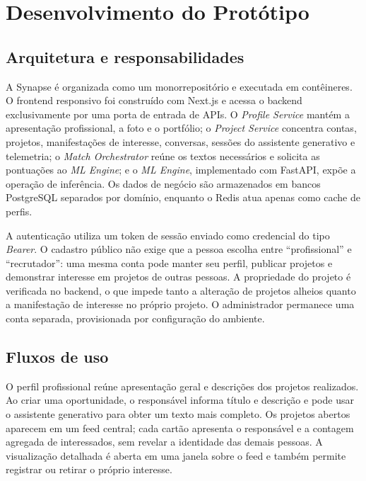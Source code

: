 \documentclass[12pt]{article}
\begin{document}
\section{Desenvolvimento do Protótipo}

\subsection{Arquitetura e responsabilidades}

A Synapse é organizada como um monorrepositório e executada em contêineres. O frontend responsivo foi construído com Next.js e acessa o backend exclusivamente por uma porta de entrada de APIs. O \textit{Profile Service} mantém a apresentação profissional, a foto e o portfólio; o \textit{Project Service} concentra contas, projetos, manifestações de interesse, conversas, sessões do assistente generativo e telemetria; o \textit{Match Orchestrator} reúne os textos necessários e solicita as pontuações ao \textit{ML Engine}; e o \textit{ML Engine}, implementado com FastAPI, expõe a operação de inferência. Os dados de negócio são armazenados em bancos PostgreSQL separados por domínio, enquanto o Redis atua apenas como cache de perfis.

A autenticação utiliza um token de sessão enviado como credencial do tipo \textit{Bearer}. O cadastro público não exige que a pessoa escolha entre ``profissional'' e ``recrutador'': uma mesma conta pode manter seu perfil, publicar projetos e demonstrar interesse em projetos de outras pessoas. A propriedade do projeto é verificada no backend, o que impede tanto a alteração de projetos alheios quanto a manifestação de interesse no próprio projeto. O administrador permanece uma conta separada, provisionada por configuração do ambiente.

\subsection{Fluxos de uso}

O perfil profissional reúne apresentação geral e descrições dos projetos realizados. Ao criar uma oportunidade, o responsável informa título e descrição e pode usar o assistente generativo para obter um texto mais completo. Os projetos abertos aparecem em um feed central; cada cartão apresenta o responsável e a contagem agregada de interessados, sem revelar a identidade das demais pessoas. A visualização detalhada é aberta em uma janela sobre o feed e também permite registrar ou retirar o próprio interesse.
\end{document}
